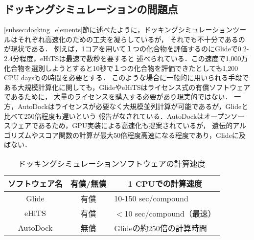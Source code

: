
\subsection{ドッキングシミュレーションの問題点}\label{subsec:docking_problem}
\ref{subsec:docking_elements}節に述べたように，ドッキングシミュレーションツールはそれぞれ高速化のための工夫を凝らしているが，
それでも不十分であるのが現状である．
例えば，1コアを用いて１つの化合物を評価するのにGlideで0.2-2.4分程度\cite{Friesner2004}，eHiTSは最速で数秒\cite{Zsoldos2007}を要すると
述べられている．この速度で1,000万化合物を選別しようとすると10秒で１つの化合物を評価できたとしても1,200 CPU daysもの時間を必要とする．
このような場合に一般的に用いられる手段である大規模計算化に関しても，GlideやeHiTSはライセンス式の有償ソフトウェアであるために，
大量のライセンスを購入する必要があり現実的ではない．
一方，AutoDockはライセンスが必要なく大規模並列計算が可能であるが，Glideと比べて250倍程度も遅いという
報告がなされている\cite{Tuccinardi2010}．AutoDockはオープンソースウェアであるため，GPU実装による高速化も提案されているが，
遺伝的アルゴリズムやスコア関数の計算が最大50倍程度高速になる程度であり\cite{Kannan2010}，Glideに及ばない．

\begin{table}[htb] \centering
	\caption{ドッキングシミュレーションソフトウェアの計算速度}
	\label{table:docking_tools}
	\begin{tabular}{c|cl}
	\hline
	ソフトウェア名					&有償/無償				&\multicolumn{1}{c}{1 CPUでの計算速度} 					\\ \hline
	Glide							&有償						&10-150 sec/compound\cite{Friesner2004}				\\
	eHiTS							&有償						&$<$10 sec/compound（最速）\cite{Zsoldos2007}			\\
	AutoDock					&無償						&Glideの約250倍の計算時間\cite{Tuccinardi2010}		\\ \hline
	\end{tabular}
\end{table}

